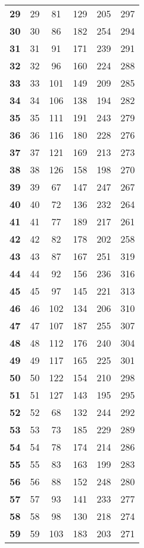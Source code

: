\begin{longtable}{|l|c|c|c|c|c|}
  \textbf{29} & 29 & 81 & 129 & 205 & 297 \\
  \textbf{30} & 30 & 86 & 182 & 254 & 294 \\
  \textbf{31} & 31 & 91 & 171 & 239 & 291 \\
  \textbf{32} & 32 & 96 & 160 & 224 & 288 \\
  \textbf{33} & 33 & 101 & 149 & 209 & 285 \\
  \textbf{34} & 34 & 106 & 138 & 194 & 282 \\
  \textbf{35} & 35 & 111 & 191 & 243 & 279 \\
  \textbf{36} & 36 & 116 & 180 & 228 & 276 \\
  \textbf{37} & 37 & 121 & 169 & 213 & 273 \\
  \textbf{38} & 38 & 126 & 158 & 198 & 270 \\
  \textbf{39} & 39 & 67 & 147 & 247 & 267 \\
  \textbf{40} & 40 & 72 & 136 & 232 & 264 \\
  \textbf{41} & 41 & 77 & 189 & 217 & 261 \\
  \textbf{42} & 42 & 82 & 178 & 202 & 258 \\
  \textbf{43} & 43 & 87 & 167 & 251 & 319 \\
  \textbf{44} & 44 & 92 & 156 & 236 & 316 \\
  \textbf{45} & 45 & 97 & 145 & 221 & 313 \\
  \textbf{46} & 46 & 102 & 134 & 206 & 310 \\
  \textbf{47} & 47 & 107 & 187 & 255 & 307 \\
  \textbf{48} & 48 & 112 & 176 & 240 & 304 \\
  \textbf{49} & 49 & 117 & 165 & 225 & 301 \\
  \textbf{50} & 50 & 122 & 154 & 210 & 298 \\
  \textbf{51} & 51 & 127 & 143 & 195 & 295 \\
  \textbf{52} & 52 & 68 & 132 & 244 & 292 \\
  \textbf{53} & 53 & 73 & 185 & 229 & 289 \\
  \textbf{54} & 54 & 78 & 174 & 214 & 286 \\
  \textbf{55} & 55 & 83 & 163 & 199 & 283 \\
  \textbf{56} & 56 & 88 & 152 & 248 & 280 \\
  \textbf{57} & 57 & 93 & 141 & 233 & 277 \\
  \textbf{58} & 58 & 98 & 130 & 218 & 274 \\
  \textbf{59} & 59 & 103 & 183 & 203 & 271 \\

\end{longtable}
